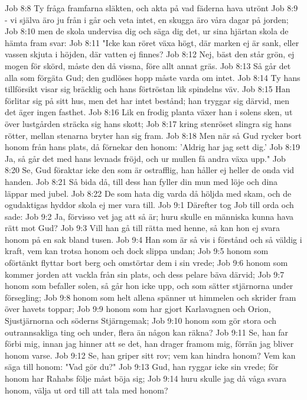 Job 8:8  Ty fråga framfarna släkten, och akta på vad fäderna hava utrönt
Job 8:9  - vi själva äro ju från i går och veta intet, en skugga äro våra dagar på jorden;
Job 8:10  men de skola undervisa dig och säga dig det, ur sina hjärtan skola de hämta fram svar:
Job 8:11  "Icke kan röret växa högt, där marken ej är sank, eller vassen skjuta i höjden, där vatten ej finnes?
Job 8:12  Nej, bäst den står grön, ej mogen för skörd, måste den då vissna, före allt annat gräs.
Job 8:13  Så går det alla som förgäta Gud; den gudlöses hopp måste varda om intet.
Job 8:14  Ty hans tillförsikt visar sig bräcklig och hans förtröstan lik spindelns väv.
Job 8:15  Han förlitar sig på sitt hus, men det har intet bestånd; han tryggar sig därvid, men det äger ingen fasthet.
Job 8:16  Lik en frodig planta växer han i solens sken, ut över lustgården sträcka sig hans skott;
Job 8:17  kring stenröset slingra sig hans rötter, mellan stenarna bryter han sig fram.
Job 8:18  Men när så Gud rycker bort honom från hans plats, då förnekar den honom: 'Aldrig har jag sett dig.'
Job 8:19  Ja, så går det med hans levnads fröjd, och ur mullen få andra växa upp."
Job 8:20  Se, Gud föraktar icke den som är ostrafflig, han håller ej heller de onda vid handen.
Job 8:21  Så bida då, till dess han fyller din mun med löje och dina läppar med jubel.
Job 8:22  De som hata dig varda då höljda med skam, och de ogudaktigas hyddor skola ej mer vara till.
Job 9:1  Därefter tog Job till orda och sade:
Job 9:2  Ja, förvisso vet jag att så är; huru skulle en människa kunna hava rätt mot Gud?
Job 9:3  Vill han gå till rätta med henne, så kan hon ej svara honom på en sak bland tusen.
Job 9:4  Han som är så vis i förstånd och så väldig i kraft, vem kan trotsa honom och dock slippa undan;
Job 9:5  honom som oförtänkt flyttar bort berg och omstörtar dem i sin vrede;
Job 9:6  honom som kommer jorden att vackla från sin plats, och dess pelare bäva därvid;
Job 9:7  honom som befaller solen, så går hon icke upp, och som sätter stjärnorna under försegling;
Job 9:8  honom som helt allena spänner ut himmelen och skrider fram över havets toppar;
Job 9:9  honom som har gjort Karlavagnen och Orion, Sjustjärnorna och söderns Stjärngemak;
Job 9:10  honom som gör stora och outrannsakliga ting och under, flera än någon kan räkna?
Job 9:11  Se, han far förbi mig, innan jag hinner att se det, han drager framom mig, förrän jag bliver honom varse.
Job 9:12  Se, han griper sitt rov; vem kan hindra honom? Vem kan säga till honom: "Vad gör du?"
Job 9:13  Gud, han ryggar icke sin vrede; för honom har Rahabs följe måst böja sig;
Job 9:14  huru skulle jag då våga svara honom, välja ut ord till att tala med honom?
